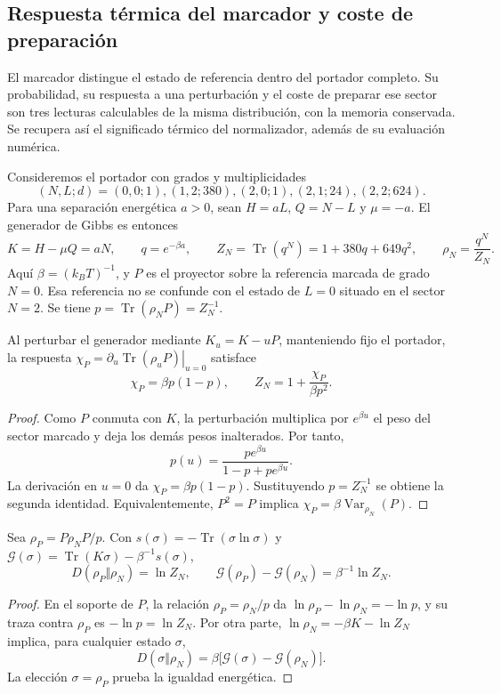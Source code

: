 \subsection{Respuesta térmica del marcador y coste de preparación}
\label{sec:termica-respuesta-preparacion-recuperada}

El marcador distingue el estado de referencia dentro del portador completo.
Su probabilidad, su respuesta a una perturbación y el coste de preparar ese
sector son tres lecturas calculables de la misma distribución, con la memoria
conservada. Se recupera así el significado térmico del normalizador, además
de su evaluación numérica.

Consideremos el portador con grados y multiplicidades
\[
 (N,L;d)=(0,0;1),(1,2;380),(2,0;1),(2,1;24),(2,2;624).
\]
Para una separación energética $a>0$, sean $H=aL$, $Q=N-L$ y
$\mu=-a$. El generador de Gibbs es entonces
\[
 K=H-\mu Q=aN,\qquad q=e^{-\beta a},\qquad
 Z_N=\operatorname{Tr}(q^N)=1+380q+649q^2,
 \qquad \rho_N=\frac{q^N}{Z_N}.
\]
Aquí $\beta=(k_B T)^{-1}$, y $P$ es el proyector sobre la referencia marcada
de grado $N=0$. Esa referencia no se confunde con el estado de $L=0$ situado
en el sector $N=2$. Se tiene $p=\operatorname{Tr}(\rho_NP)=Z_N^{-1}$.

\begin{proposition}
Al perturbar el generador mediante $K_u=K-uP$, manteniendo fijo el portador,
la respuesta $\chi_P=\left.\partial_u\operatorname{Tr}(\rho_uP)\right|_{u=0}$
satisface
\[
 \chi_P=\beta p(1-p),\qquad
 Z_N=1+\frac{\chi_P}{\beta p^2}.
\]
\end{proposition}
\begin{proof}
Como $P$ conmuta con $K$, la perturbación multiplica por $e^{\beta u}$
el peso del sector marcado y deja los demás pesos inalterados. Por tanto,
\[
 p(u)=\frac{p e^{\beta u}}{1-p+p e^{\beta u}}.
\]
La derivación en $u=0$ da $\chi_P=\beta p(1-p)$. Sustituyendo
$p=Z_N^{-1}$ se obtiene la segunda identidad. Equivalentemente,
$P^2=P$ implica $\chi_P=\beta\operatorname{Var}_{\rho_N}(P)$.
\end{proof}

\begin{proposition}
Sea $\rho_P=P\rho_NP/p$. Con
$s(\sigma)=-\operatorname{Tr}(\sigma\ln\sigma)$ y
$\mathcal G(\sigma)=\operatorname{Tr}(K\sigma)-\beta^{-1}s(\sigma)$,
\[
 D(\rho_P\Vert\rho_N)=\ln Z_N,\qquad
 \mathcal G(\rho_P)-\mathcal G(\rho_N)=\beta^{-1}\ln Z_N.
\]
\end{proposition}
\begin{proof}
En el soporte de $P$, la relación $\rho_P=\rho_N/p$ da
$\ln\rho_P-\ln\rho_N=-\ln p$, y su traza contra $\rho_P$ es
$-\ln p=\ln Z_N$. Por otra parte,
$\ln\rho_N=-\beta K-\ln Z_N$ implica, para cualquier estado $\sigma$,
\[
 D(\sigma\Vert\rho_N)
 =\beta\bigl[\mathcal G(\sigma)-\mathcal G(\rho_N)\bigr].
\]
La elección $\sigma=\rho_P$ prueba la igualdad energética.
\end{proof}

